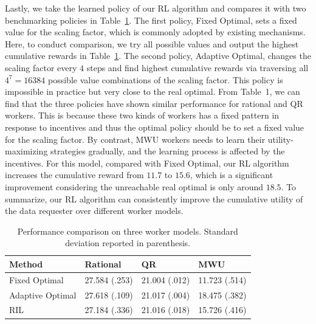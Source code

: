 %

%

Lastly, we take the learned policy of our RL algorithm and compares it with two benchmarking policies in Table~\ref{table:performance}. The first policy, Fixed Optimal, sets a fixed value for the scaling factor, which is commonly adopted by existing mechanisms. Here, to conduct comparison, we try all possible values and output the highest cumulative rewards in Table~\ref{table:performance}. The second policy, Adaptive Optimal, changes the scaling factor every $4$ steps and find highest cumulative rewards via traversing all $4^7=16384$ possible value combinations of the scaling factor. This policy is impossible in practice but very close to the real optimal.
From Table~1, we can find that the three policies have shown similar performance for rational and QR workers.
This is because these two kinds of workers has a fixed pattern in response to incentives and thus the optimal policy should be to set a fixed value for the scaling factor.
By contrast, MWU workers needs to learn their utility-maximizing strategies gradually, and the learning process is affected by the incentives.
For this model, compared with Fixed Optimal, our RL algorithm increases the cumulative reward from $11.7$ to $15.6$, which is a significant improvement considering the unreachable real optimal is only around $18.5$. To summarize, our RL algorithm can consistently improve the cumulative utility of the data requester over different worker models.

\begin{table}[t]
\caption{Performance comparison on three worker models. Standard deviation reported in parenthesis.}
\label{table:performance}
\vskip 0.15in
\centering
{\scriptsize
\begin{sc}
\begin{tabular}{ l | l | l | l }
\hline
Method & Rational & QR & MWU \\ \hline \hline
Fixed Optimal & 27.584 (.253) & 21.004 (.012) & 11.723 (.514) \\
Adaptive Optimal & 27.618 (.109) & 21.017 (.004) & 18.475 (.382) \\
\hline
RIL & 27.184 (.336) & 21.016 (.018) & 15.726 (.416)\\
\hline
\end{tabular}
\end{sc}
}
\vskip -0.1in
\end{table}




